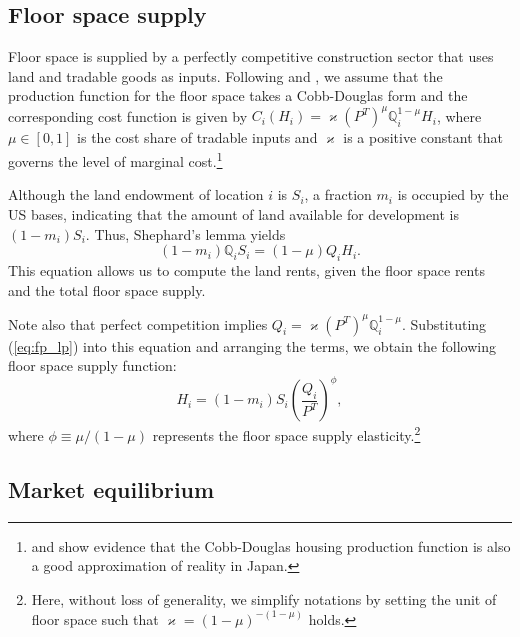\documentclass[12pt, unicode, a4paper]{article}
\newcommand{\1}{\mbox{1}\hspace{-0.25em}\mbox{l}} %
\begin{document}
\subsection{Floor space supply}

Floor space is supplied by a perfectly competitive construction sector that uses land and tradable goods as inputs. Following \cite{epple2010new} and \cite{combes2021production}, we assume that the production function for the floor space takes a Cobb-Douglas form and the corresponding cost function is given by $C_i(H_i)=\varkappa \left( P^T \right)^\mu \mathbb{Q}_i^{1-\mu} H_i$, where $\mu \in [0,1]$ is the cost share of tradable inputs and $\varkappa$ is a positive constant that governs the level of marginal cost.\footnote{
\cite{yoshida18} and \cite{KII2022} show evidence that the Cobb-Douglas housing production function is also a good approximation of reality in Japan.
}

Although the land endowment of location $i$ is $S_i$, a fraction $m_i$ is occupied by the US bases, indicating that the amount of land available for development is $(1-m_i)S_i$. Thus, Shephard's lemma yields
\begin{equation}
    (1-m_i)\mathbb{Q}_iS_i=(1-\mu)Q_iH_i.
    \label{eq:fp_lp}
\end{equation}
This equation allows us to compute the land rents, given the floor space rents and the total floor space supply.

Note also that perfect competition implies $Q_i=\varkappa \left( P^T \right)^\mu \mathbb{Q}_i^{1-\mu}$. Substituting (\ref{eq:fp_lp}) into this equation and arranging the terms, we obtain the following floor space supply function:
\begin{equation*}
    H_i=(1-m_i)S_i\left( \frac{Q_i}{P^T} \right)^\phi ,
\end{equation*}
where $\phi \equiv \mu/(1-\mu)$ represents the floor space supply elasticity.\footnote{
Here, without loss of generality, we simplify notations by setting the unit of floor space such that $\varkappa=(1-\mu)^{-(1-\mu)}$ holds.}


\subsection{Market equilibrium}
\end{document}
